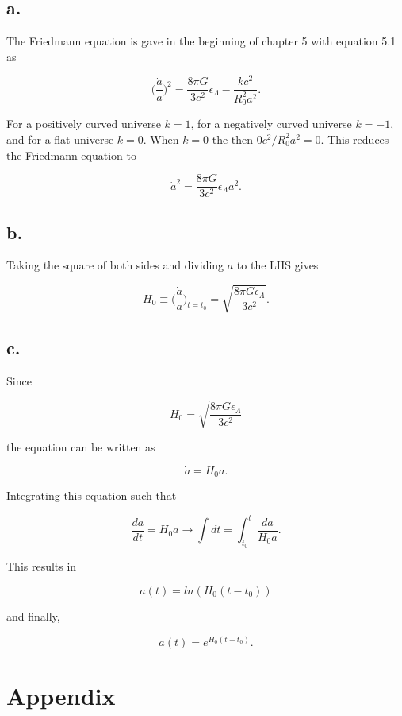 \documentclass[12pt]{article}
\begin{document}
\subsection*{a.}

The Friedmann equation is gave in the beginning of chapter 5 with equation 5.1 as

$$
\Big(\frac{\dot{a}}{a}\Big)^{2} = \frac{8\pi G}{3c^{2}}\epsilon_{\Lambda} - \frac{kc^{2}}{R^{2}_{0}a^{2}}.
$$

For a positively curved universe $k=1$, for a negatively curved universe $k=-1$, and for a flat universe $k=0$. When $k=0$ the then $0c^{2}/R^{2}_{0}a^{2} = 0$. This reduces the Friedmann equation to 

$$
\dot{a}^{2} = \frac{8\pi G}{3c^{2}}\epsilon_{\Lambda} a^{2}.
$$

\subsection*{b.}

Taking the square of both sides and dividing $a$ to the LHS gives 

$$
H_{0} \equiv \Big(\frac{\dot{a}}{a}\Big)_{t=t_{0}} = \sqrt{\frac{8\pi G \epsilon_{\Lambda}}{3c^{2}}}.
$$

\subsection*{c.}

Since 

$$
H_{0} = \sqrt{\frac{8\pi G \epsilon_{\Lambda}}{3c^{2}}}
$$

the equation can be written as

$$
\dot{a} = H_{0}a.
$$

Integrating this equation such that 

$$
\frac{da}{dt} = H_{0}a \rightarrow \int dt = \int_{t_{0}}^{t} \frac{da}{H_{0}a}.
$$

This results in 

$$
a(t) = ln(H_{0}(t - t_{0}))
$$

and finally,

$$
a(t) = e^{H_{0}(t-t_{0})}.
$$


\section*{Appendix}
\end{document}
